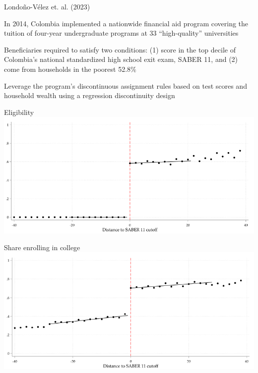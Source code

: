 \documentclass{./../div_teaching_slides}
\begin{document}
\begin{frame}{Londo\~{n}o-V\'{e}lez et. al. (2023)}
\begin{witemize}
  \item In 2014, Colombia implemented a nationwide financial aid program covering the tuition of four-year undergraduate programs at 33 ``high-quality'' universities
  \item Beneficiaries required to satisfy two conditions: (1) score in the top decile of Colombia’s national standardized high school exit exam, SABER 11, and (2) come from households in the poorest 52.8\%
  \item Leverage the program’s discontinuous assignment rules based
on test scores and household wealth using a regression discontinuity design
\end{witemize}

\end{frame}
\begin{frame}{Eligibility}
\includegraphics[scale=0.475]{rd1.png}
\end{frame}

\begin{frame}{Share enrolling in college}
\includegraphics[scale=0.55]{rd2.png}
\end{frame}
\end{document}
